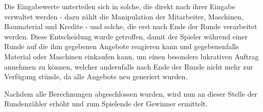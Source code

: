 Die Eingabewerte unterteilen sich in solche, die direkt nach ihrer Eingabe verwaltet werden - dazu zählt die Manipulation der Mitarbeiter, Maschinen, Baumaterial und Kredite - und solche, die erst nach Ende der Runde verarbeitet werden. Diese Entscheidung wurde getroffen, damit der Spieler während einer Runde auf die ihm gegebenen Angebote reagieren kann und gegebenenfalls Material oder Maschinen einkaufen kann, um einen besonders lukrativen Auftrag annehmen zu können, welcher andernfalls nach Ende der Runde nicht mehr zur Verfügung stünde, da alle Angebote neu generiert wurden.

Nachdem alle Berechnungen abgeschlossen wurden, wird nun an dieser Stelle der Rundenzähler erhöht und zum Spielende der Gewinner ermittelt.



